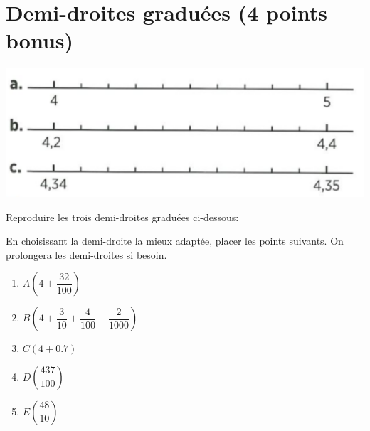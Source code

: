 \section{Demi-droites graduées (4 points bonus)}

\begin{center}
	\includegraphics[scale=0.25]{img/axes}
\end{center}

\begin{questions}
	\question[1] Reproduire les trois demi-droites graduées ci-dessous:
	
	\question[3] En choisissant la demi-droite la mieux adaptée, placer les points suivants. On prolongera les demi-droites si besoin.
	
	\begin{multicols}{2}
		\begin{enumerate}
			\item $A\left( 4 + \dfrac{32}{100}\right)$
			\item $B\left(4 + \dfrac{3}{10} + \dfrac{4}{100} + \dfrac{2}{\num{1000}}\right)$
			\item $C(4 + \num{0.7})$
			\item $D\left(\dfrac{437}{100}\right)$
			\item $E\left(\dfrac{48}{10}\right)$
		\end{enumerate}
	\end{multicols}
\end{questions}